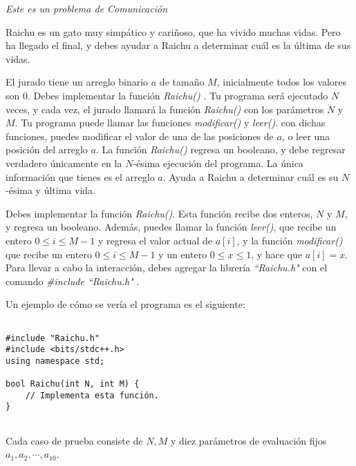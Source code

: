 \documentclass[12pt]{scrartcl}
\begin{document}
    
    {\itshape Este es un problema de Comunicación}
    
    \vspace{10pt}

        Raichu es un gato muy simpático y cariñoso, que ha vivido muchas vidas. Pero ha llegado el final, y debes ayudar a Raichu a determinar cuál es la última de sus vidas. 


        El jurado tiene un arreglo binario $a$ de tamaño $M$, inicialmente todos los valores son $0$. Debes implementar la función {\itshape Raichu()} . Tu programa será ejecutado $N$  veces, y cada vez, el jurado llamará la función {\itshape Raichu()} con los parámetros $N$ y $M$. Tu programa puede llamar las funciones {\itshape modificar() } y {\itshape leer()}. con dichas funciones, puedes modificar el valor de una de las posiciones de $a$, o leer una posición del arreglo $a$. La función {\itshape Raichu()} regresa un booleano, y debe regresar verdadero únicamente en la $N$-ésima ejecución del programa. La única información que tienes es el arreglo $a$. Ayuda a Raichu a determinar cuál es su $N$-ésima y última vida.



        Debes implementar la función {\itshape Raichu()}. Esta función recibe dos enteros, $N$ y $M$, y regresa un booleano. Además, puedes llamar la función {\itshape leer()}, que recibe un entero $0 \le i \le M - 1$ y regresa el valor actual de $a[i]$, y la función {\itshape modificar()} que recibe un entero $0 \le i \le M - 1$ y un entero $0 \le x \le 1$, y hace que $a[i] = x$.
        Para llevar a cabo la interacción, debes agregar la librería \textit{``Raichu.h" } con el comando \textit{\#include ``Raichu.h" }. 

        Un ejemplo de cómo se vería el programa es el siguiente:

\begin{verbatim}

#include "Raichu.h"
#include <bits/stdc++.h>
using namespace std;

bool Raichu(int N, int M) {
    // Implementa esta función.
}
    
\end{verbatim}
        


        Cada caso de prueba consiste de $N, M$ y diez parámetros de evaluación fijos $a_1, a_2, \cdots, a_{10}$.
\end{document}
